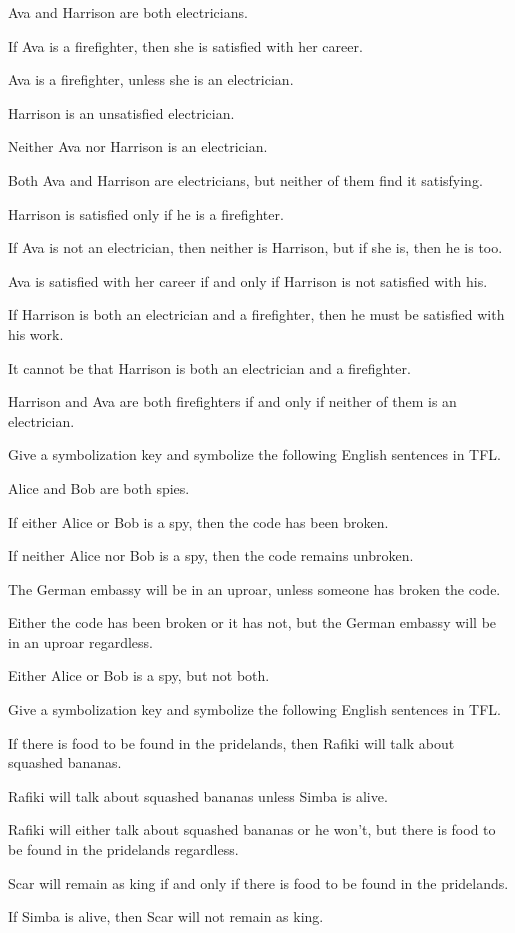 \begin{earg}
\item Ava and Harrison are both electricians.
\item If Ava is a firefighter, then she is satisfied with her career.
\item Ava is a firefighter, unless she is an electrician.
\item Harrison is an unsatisfied electrician.
\item Neither Ava nor Harrison is an electrician.
\item Both Ava and Harrison are electricians, but neither of them find it satisfying.
\item Harrison is satisfied only if he is a firefighter.
\item If Ava is not an electrician, then neither is Harrison, but if she is, then he is too.
\item Ava is satisfied with her career if and only if Harrison is not satisfied with his.
\item If Harrison is both an electrician and a firefighter, then he must be satisfied with his work.
\item It cannot be that Harrison is both an electrician and a firefighter.
\item Harrison and Ava are both firefighters if and only if neither of them is an electrician.
\end{earg}

\problempart
\label{pr.spies}
Give a symbolization key and symbolize the following English sentences in TFL.
\begin{earg}
\item Alice and Bob are both spies.
\item If either Alice or Bob is a spy, then the code has been broken.
\item If neither Alice nor Bob is a spy, then the code remains unbroken.
\item The German embassy will be in an uproar, unless someone has broken the code.
\item Either the code has been broken or it has not, but the German embassy will be in an uproar regardless.
\item Either Alice or Bob is a spy, but not both.
\end{earg}

\problempart Give a symbolization key and symbolize the following English sentences in TFL.
\begin{earg}
\item If there is food to be found in the pridelands, then Rafiki will talk about squashed bananas.
\item Rafiki will talk about squashed bananas unless Simba is alive.
\item Rafiki will either talk about squashed bananas or he won't, but there is food to be found in the pridelands regardless.
\item Scar will remain as king if and only if there is food to be found in the pridelands.
\item If Simba is alive, then Scar will not remain as king.
\end{earg}

